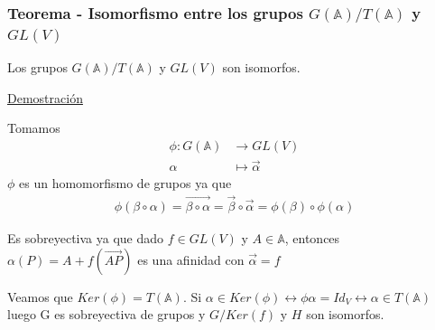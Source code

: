 \documentclass[12pt, a4paper, ones, notitlepage, openany,titlepage]{article}
\newcommand{\demostracion}{\noindent\underline{Demostración}}
\begin{document}
\subsubsection{Teorema - Isomorfismo entre los grupos $G(\mathbb{A}) / T(\mathbb{A})$ y $G L(V)$}
\noindent Los grupos $G(\mathbb{A}) / T(\mathbb{A})$ y $G L(V)$ son isomorfos.

\demostracion

\noindent Tomamos
$$
\begin{aligned}
\phi: G(\mathbb{A}) & \longrightarrow G L(V) \\
\alpha & \longmapsto \overrightarrow{\alpha}
\end{aligned}
$$
\noindent $\phi$ es un homomorfismo de grupos ya que
$$
\begin{aligned}
	\phi(\beta\circ\alpha)=\overrightarrow{\beta\circ\alpha}=\overrightarrow{\beta}\circ\overrightarrow{\alpha}=\phi(\beta)\circ\phi(\alpha)
\end{aligned}
$$

Es sobreyectiva ya que dado $f\in GL(V)$ y $A\in\mathbb{A}$, entonces $\alpha(P) = A + f(\overrightarrow{AP})$ es una afinidad con $\overrightarrow{\alpha}=f$

Veamos que $Ker(\phi)=T(\mathbb{A})$. Si $\alpha\in Ker(\phi) \longleftrightarrow \phi{\alpha} = Id_{V} \longleftrightarrow \alpha\in T(\mathbb{A})$ luego G es sobreyectiva de grupos y $G/Ker(f)$ y $H$ son isomorfos.
\end{document}
